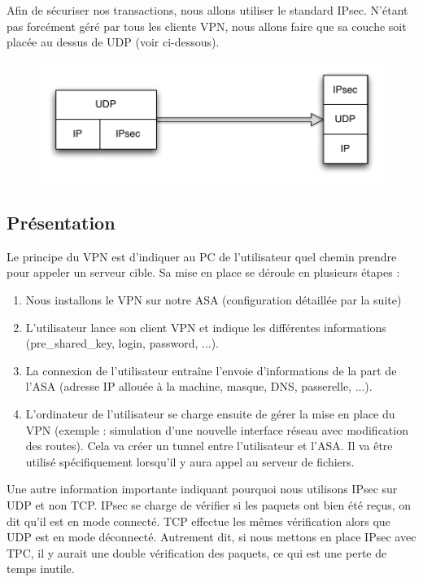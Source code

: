 \documentclass[a4paper,12pt]{article}
\begin{document}
Afin de sécuriser nos transactions, nous allons utiliser le standard IPsec. N'étant pas forcément géré par tous les clients VPN, nous allons faire que
sa couche soit placée au dessus de UDP (voir ci-dessous).
\begin{figure}[H]
	\center
	\includegraphics[width=12cm]{img/OSIipsec.pdf}
\end{figure}

\subsection{Présentation}
Le principe du VPN est d'indiquer au PC de l'utilisateur quel chemin prendre pour appeler un serveur cible. Sa mise en place se déroule en plusieurs
étapes : 
\begin{enumerate}
	\item Nous installons le VPN sur notre ASA (configuration détaillée par la suite)
	\item L'utilisateur lance son client VPN et indique les différentes informations (pre\_shared\_key, login, password, ...).
	\item La connexion de l'utilisateur entraîne l'envoie d'informations de la part de l'ASA (adresse IP allouée à la machine, masque, DNS, passerelle, ...).
	\item L'ordinateur de l'utilisateur se charge ensuite de gérer la mise en place du VPN (exemple : simulation d'une nouvelle interface réseau avec 
	modification des routes).
Cela va créer un tunnel entre l'utilisateur et l'ASA. Il va être utilisé spécifiquement lorsqu'il y aura appel au serveur de fichiers.
\end{enumerate}

Une autre information importante indiquant pourquoi nous utilisons IPsec sur UDP et non TCP. IPsec se charge de vérifier si les paquets ont bien été reçus, on dit
qu'il est en mode connecté. TCP effectue les mêmes vérification alors que UDP est en mode déconnecté. Autrement dit, si nous mettons en place IPsec avec TPC, il 
y aurait une double vérification des paquets, ce qui est une perte de temps inutile.
\end{document}
